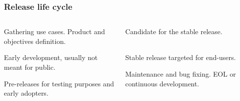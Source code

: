 \documentclass[aspectratio=169]{beamer}              %
\begin{document}
\begin{frame}
	\frametitle{Release life cycle}
	
\begin{columns}
\begin{column}{0.5\textwidth}
   	\begin{block}{\color{orange}{1. Planning}}
   		\vspace{1mm}
Gathering use cases. Product and objectives definition.
	\end{block}
	\begin{block}{\color{orange}{2. Pre-Alpha}}
   		\vspace{1mm}
Early development, usually not meant for public.
     \end{block}
         \begin{block}{\color{orange}{3. Alpha/Beta}}
   		\vspace{1mm}
Pre-releases for testing purposes and early adopters.
     \end{block}
     
\end{column}
\begin{column}{0.5\textwidth} 
\begin{block}{\color{orange}{4. Release candidate (RC)}}
   		\vspace{1mm}
Candidate for the stable release.\\~
     \end{block}
      \begin{block}{\color{orange}{5. Stable release}}
   		\vspace{1mm}
Stable release targeted for end-users.
     \end{block}
      \begin{block}{\color{orange}{6. Mature project/Maintenance}}
   		\vspace{1mm}
Maintenance and bug fixing. EOL or continuous development.
     \end{block}
\end{column}
\end{columns}

\end{frame}
\end{document}
